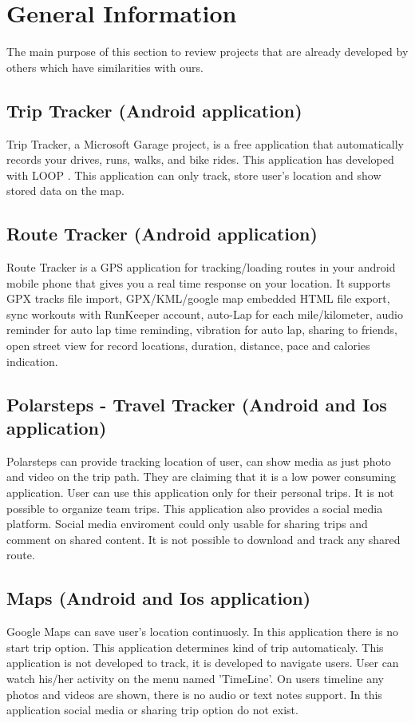 \chapter{General Information}
The main purpose of this section to review projects that are already developed by others which have similarities with ours.
\section{Trip Tracker (Android application)}
Trip Tracker\cite{triptracker}, a Microsoft Garage project, is a free application that automatically records your drives, runs, walks, and bike rides. This application has developed with LOOP \cite{loop}. This application can only track, store user's location and show stored data on the map.

\section{Route Tracker (Android application)}
Route Tracker \cite{routetracker} is a GPS application for tracking/loading routes in your android mobile phone that gives you a real time response on your location. It supports GPX tracks file import, GPX/KML/google map embedded HTML file export, sync workouts with RunKeeper account, auto-Lap for each mile/kilometer, audio reminder for auto lap time reminding, vibration for auto lap, sharing to friends, open street view for record locations, duration, distance, pace and calories indication.

\section{Polarsteps - Travel Tracker (Android and Ios application)}
Polarsteps \cite{polarsteps} can provide tracking location of user, can show media as just photo and video on the trip path. They are claiming that it is a low power consuming application. User can use this application only for their personal trips. It is not possible to organize team trips. This application also provides a social media platform. Social media enviroment could only usable for sharing trips and comment on shared content. It is not possible to download and track any shared route.

\section{Maps (Android and Ios application)}
Google Maps \cite{googlemap} can save user's location continuosly. In this application there is no start trip option. This application determines kind of trip automaticaly. This application is not developed to track, it is developed to navigate users. User can watch his/her activity on the menu named 'TimeLine'. On users timeline any photos and videos are shown, there is no audio or text notes support. In this application social media or sharing trip option do not exist.

